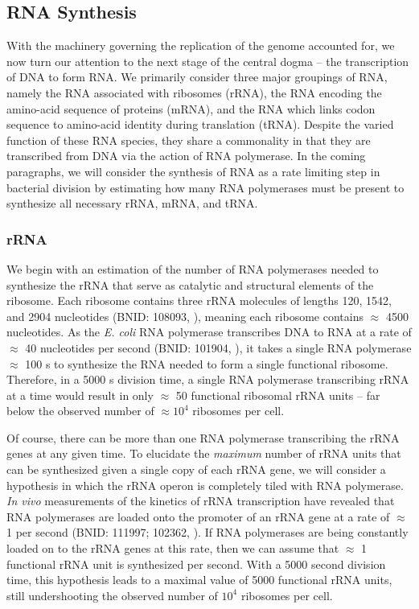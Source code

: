 \subsection{RNA Synthesis}\label{sec:RNA_synthesis}
With the machinery governing the replication of the genome accounted for, we
now turn our attention to the next stage of the central dogma -- the
transcription of DNA to form RNA. We primarily consider three major groupings
of RNA, namely the RNA associated with ribosomes (rRNA), the RNA encoding the
amino-acid sequence of proteins (mRNA), and the RNA which links codon
sequence to amino-acid identity during translation (tRNA). Despite the varied
function of these RNA species, they share a commonality in that they are
transcribed from DNA via the action of RNA polymerase. In the coming
paragraphs, we will consider the synthesis of RNA as a rate limiting step in
bacterial division by estimating how many RNA polymerases must be present to
synthesize all necessary rRNA, mRNA, and tRNA.

\subsubsection{rRNA}
We begin with an estimation of the number of RNA polymerases needed to
synthesize the rRNA that serve as catalytic and structural elements of the
ribosome. Each ribosome contains three rRNA molecules of lengths 120, 1542,
and 2904 nucleotides (BNID: 108093, \cite{milo2010}), meaning each ribosome
contains $\approx$ 4500 nucleotides. As the \textit{E. coli} RNA polymerase
transcribes DNA to RNA at a rate of $\approx$ 40 nucleotides per second
(BNID: 101904, \cite{milo2010}), it takes a single RNA polymerase
$\approx$ 100 s to synthesize the RNA needed to form a single functional ribosome.
Therefore, in a 5000 s division time, a single RNA polymerase transcribing
rRNA at a time would result in only $\approx$ 50 functional ribosomal rRNA
units -- far below the observed number of $\approx 10^4$ ribosomes per cell.

Of course, there can be more than one RNA polymerase transcribing the rRNA genes
at any given time. To elucidate the \textit{maximum} number of rRNA units that can
be synthesized given a single copy of each rRNA gene, we will consider a
hypothesis in which the rRNA operon is completely tiled with RNA polymerase.
\textit{In vivo} measurements of the kinetics of rRNA transcription have revealed that
RNA polymerases are loaded onto the promoter of an rRNA gene at a rate of
$\approx$ 1 per second (BNID: 111997; 102362, \cite{milo2010}). If RNA
polymerases are being constantly loaded on to the rRNA genes at this rate,
then we can assume that $\approx$ 1 functional rRNA unit is
synthesized per second. With a 5000 second division time, this hypothesis
leads to a maximal value of 5000 functional rRNA units, still undershooting
the observed number of $10^4$ ribosomes per cell.

